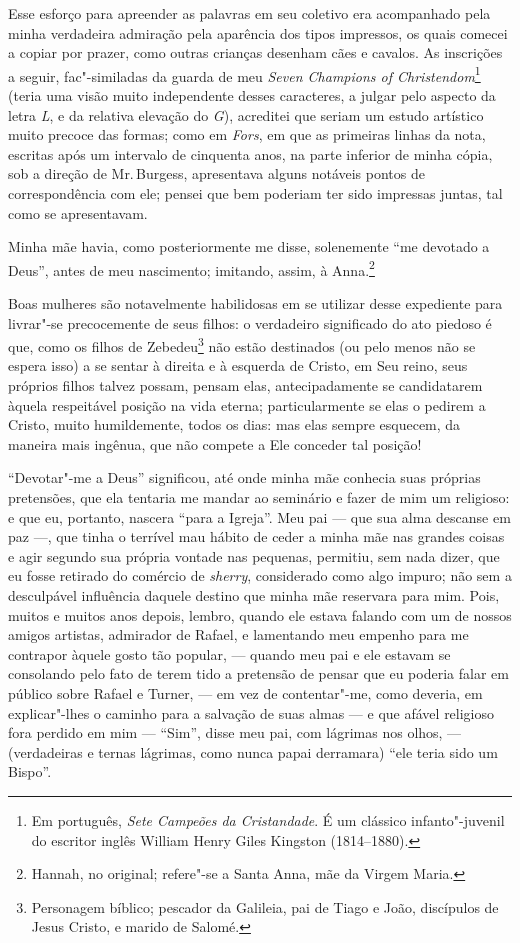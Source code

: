 Esse esforço para apreender as palavras em seu coletivo era
acompanhado pela minha verdadeira admiração pela aparência dos tipos
impressos, os quais comecei a copiar por prazer, como outras crianças
desenham cães e cavalos. As inscrições a seguir, fac"-similadas da guarda
de meu \textit{Seven Champions of Christendom}\footnote{Em português, \textit{Sete
  Campeões da Cristandade}. É um clássico infanto"-juvenil do escritor inglês
  William Henry Giles Kingston (1814--1880).} (teria uma
visão muito independente desses caracteres, a julgar pelo aspecto da
letra \textit{L}, e da relativa elevação do \textit{G}), acreditei que seriam um estudo
artístico muito precoce das formas; como em \textit{Fors}, em que as
primeiras linhas da nota, escritas após um intervalo de cinquenta anos,
na parte inferior de minha cópia, sob a direção de Mr.\,Burgess,
apresentava alguns notáveis pontos de correspondência com ele; pensei
que bem poderiam ter sido impressas juntas, tal como se apresentavam.

Minha mãe havia, como posteriormente me disse, solenemente ``me
devotado a Deus'', antes de meu nascimento; imitando, assim, à
Anna.\footnote{Hannah, no original; refere"-se a Santa Anna, mãe da Virgem
  Maria.}

Boas mulheres são notavelmente habilidosas em se utilizar desse
expediente para livrar"-se precocemente de seus filhos: o verdadeiro
significado do ato piedoso é que, como os filhos de Zebedeu\footnote{Personagem
  bíblico; pescador da Galileia, pai de Tiago e João, discípulos de
  Jesus Cristo, e marido de Salomé.} não estão destinados
(ou pelo menos não se espera isso) a se sentar à direita e à esquerda de
Cristo, em Seu reino, seus próprios filhos talvez possam, pensam elas,
antecipadamente se candidatarem àquela respeitável posição na vida
eterna; particularmente se elas o pedirem a Cristo, muito humildemente,
todos os dias: mas elas sempre esquecem, da maneira mais ingênua, que
não compete a Ele conceder tal posição!

``Devotar"-me a Deus'' significou, até onde minha mãe conhecia suas
próprias pretensões, que ela tentaria me mandar ao seminário e fazer de
mim um religioso: e que eu, portanto, nascera ``para a Igreja''. Meu
pai --- que sua alma descanse em paz ---, que tinha o terrível mau hábito
de ceder a minha mãe nas grandes coisas e agir segundo sua própria
vontade nas pequenas, permitiu, sem nada dizer, que eu fosse retirado do
comércio de \textit{sherry}, considerado como algo impuro; não sem a
desculpável influência daquele destino que minha mãe reservara para mim.
Pois, muitos e muitos anos depois, lembro, quando ele estava falando com
um de nossos amigos artistas, admirador de Rafael, e lamentando meu
empenho para me contrapor àquele gosto tão popular, --- quando meu pai e
ele estavam se consolando pelo fato de terem tido a pretensão de pensar
que eu poderia falar em público sobre Rafael e Turner, --- em vez de
contentar"-me, como deveria, em explicar"-lhes o caminho para a salvação
de suas almas --- e que afável religioso fora perdido em mim --- ``Sim'',
disse meu pai, com lágrimas nos olhos, --- (verdadeiras e ternas lágrimas,
como nunca papai derramara) ``ele teria sido um Bispo''.

